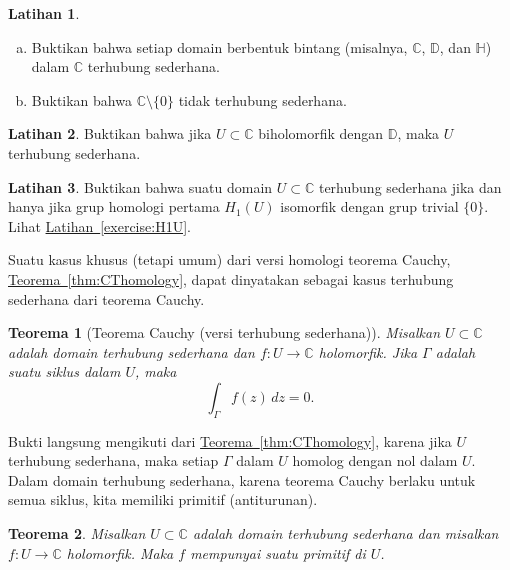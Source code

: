 \documentclass[12pt,openany]{book}
\newcommand{\C}{{\mathbb{C}}}
\newcommand{\D}{{\mathbb{D}}}
\newcommand{\bH}{{\mathbb{H}}}
\theoremstyle{plain}
\newtheorem{thm}{Teorema}[section]
\theoremstyle{remark}
\theoremstyle{definition}
\newenvironment{exbox}{%
    \def\FrameCommand{\vrule width 1pt \relax\hspace{10pt}}%
    \MakeFramed{\advance\hsize-\width\FrameRestore}%
}{%
    \endMakeFramed
}
\newenvironment{exparts}{%
    \leavevmode\begin{enumerate}[a),noitemsep,topsep=0pt,parsep=0pt,partopsep=0pt]
}{%
    \end{enumerate}
}
\theoremstyle{exercise}
\newtheorem{exercise}{Latihan}[section]
\theoremstyle{example}
\newcommand{\exerciseref}[1]{\hyperref[#1]{Latihan~\ref*{#1}}}
\newcommand{\thmref}[1]{\hyperref[#1]{Teorema~\ref*{#1}}}
\begin{document}
\begin{exbox}
\begin{exercise}
\begin{exparts}
\item
Buktikan bahwa setiap domain berbentuk bintang (misalnya, $\C$, $\D$, dan $\bH$) dalam $\C$ terhubung sederhana.
\item
Buktikan bahwa $\C \setminus \{ 0 \}$ tidak terhubung sederhana.
\end{exparts}
\end{exercise}

\begin{exercise}
Buktikan bahwa jika $U \subset \C$ biholomorfik dengan $\D$, maka $U$
terhubung sederhana.
\end{exercise}

\begin{exercise}
Buktikan bahwa suatu domain $U \subset \C$ terhubung sederhana jika dan hanya jika
grup homologi pertama
$H_1(U)$ isomorfik dengan grup trivial $\{ 0 \}$.
Lihat \exerciseref{exercise:H1U}.
\end{exercise}
\end{exbox}

Suatu kasus khusus (tetapi umum) dari versi homologi teorema Cauchy,
\thmref{thm:CThomology}, dapat dinyatakan sebagai kasus terhubung sederhana dari teorema Cauchy.

\begin{thm}[Teorema Cauchy (versi terhubung sederhana)]
%
Misalkan $U \subset \C$ adalah domain terhubung sederhana dan $f \colon U \to \C$
holomorfik.  Jika $\Gamma$ adalah suatu siklus dalam $U$, maka
\begin{equation*}
\int_\Gamma f(z) \, dz = 0 .
\end{equation*}
\end{thm}

Bukti langsung mengikuti dari \thmref{thm:CThomology},
karena jika $U$ terhubung sederhana, maka
setiap $\Gamma$ dalam $U$ homolog dengan nol dalam $U$.
Dalam domain terhubung sederhana,
karena teorema Cauchy berlaku untuk semua siklus,
kita memiliki primitif (antiturunan).

\begin{thm}
Misalkan $U \subset \C$ adalah domain terhubung sederhana dan
misalkan $f \colon U \to \C$ holomorfik. Maka $f$ mempunyai suatu
primitif di $U$.
\end{thm}
\end{document}
